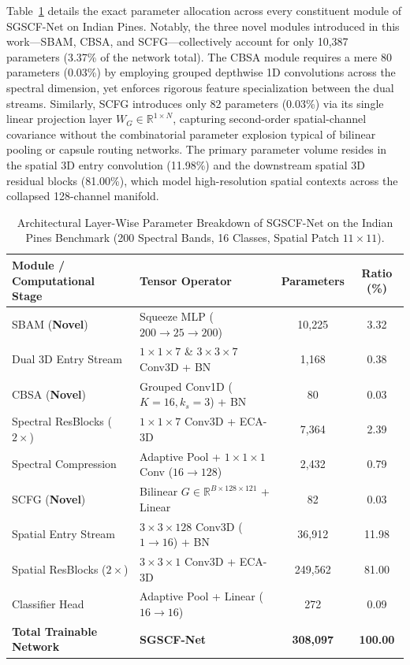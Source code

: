 \documentclass[manuscript,screen,review]{acmart}
\begin{document}
Table~\ref{tab:layer_param_breakdown} details the exact parameter allocation across every constituent module of SGSCF-Net on Indian Pines. Notably, the three novel modules introduced in this work---SBAM, CBSA, and SCFG---collectively account for only 10,387 parameters (3.37\% of the network total). The CBSA module requires a mere 80 parameters (0.03\%) by employing grouped depthwise 1D convolutions across the spectral dimension, yet enforces rigorous feature specialization between the dual streams. Similarly, SCFG introduces only 82 parameters (0.03\%) via its single linear projection layer $W_G \in \mathbb{R}^{1 \times N}$, capturing second-order spatial-channel covariance without the combinatorial parameter explosion typical of bilinear pooling or capsule routing networks. The primary parameter volume resides in the spatial 3D entry convolution (11.98\%) and the downstream spatial 3D residual blocks (81.00\%), which model high-resolution spatial contexts across the collapsed 128-channel manifold.

\begin{table}[t]
\centering
\footnotesize
\caption{Architectural Layer-Wise Parameter Breakdown of SGSCF-Net on the Indian Pines Benchmark (200 Spectral Bands, 16 Classes, Spatial Patch $11 \times 11$).}
\label{tab:layer_param_breakdown}
\begin{tabular}{llcc}
\toprule
\textbf{Module / Computational Stage} & \textbf{Tensor Operator} & \textbf{Parameters} & \textbf{Ratio (\%)} \\
\midrule
SBAM (\textbf{Novel}) & Squeeze MLP ($200 \to 25 \to 200$) & 10,225 & 3.32 \\
Dual 3D Entry Stream & $1\times 1\times 7$ \& $3\times 3\times 7$ Conv3D + BN & 1,168 & 0.38 \\
CBSA (\textbf{Novel}) & Grouped Conv1D ($K=16, k_s=3$) + BN & 80 & 0.03 \\
Spectral ResBlocks ($2\times$) & $1\times 1\times 7$ Conv3D + ECA-3D & 7,364 & 2.39 \\
Spectral Compression & Adaptive Pool + $1\times 1\times 1$ Conv ($16 \to 128$) & 2,432 & 0.79 \\
SCFG (\textbf{Novel}) & Bilinear $G \in \mathbb{R}^{B \times 128 \times 121}$ + Linear & 82 & 0.03 \\
Spatial Entry Stream & $3\times 3\times 128$ Conv3D ($1 \to 16$) + BN & 36,912 & 11.98 \\
Spatial ResBlocks ($2\times$) & $3\times 3\times 1$ Conv3D + ECA-3D & 249,562 & 81.00 \\
Classifier Head & Adaptive Pool + Linear ($16 \to 16$) & 272 & 0.09 \\
\midrule
\textbf{Total Trainable Network} & \textbf{SGSCF-Net} & \textbf{308,097} & \textbf{100.00} \\
\bottomrule
\end{tabular}
\end{table}
\end{document}

